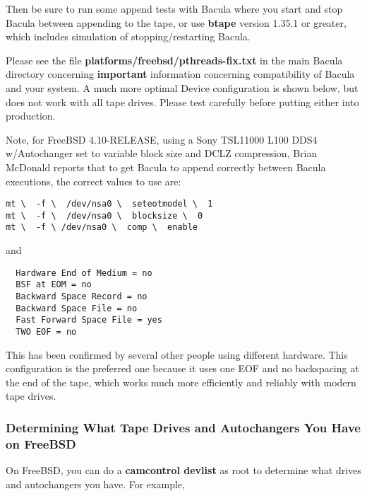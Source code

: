 Then be sure to run some append tests with Bacula where you start and stop
Bacula between appending to the tape, or use {\bf btape} version 1.35.1 or
greater, which includes simulation of stopping/restarting Bacula. 

Please see the file {\bf platforms/freebsd/pthreads-fix.txt} in the main
Bacula directory concerning {\bf important} information concerning
compatibility of Bacula and your system. A much more optimal Device
configuration is shown below, but does not work with all tape drives. Please
test carefully before putting either into production. 

Note, for FreeBSD 4.10-RELEASE, using a Sony TSL11000 L100 DDS4 w/Autochanger
set to variable block size and DCLZ compression, Brian McDonald reports that
to get Bacula to append correctly between Bacula executions, the correct
values to use are: 

\footnotesize
\begin{verbatim}
mt \  -f \  /dev/nsa0 \  seteotmodel \  1
mt \  -f \  /dev/nsa0 \  blocksize \  0
mt \  -f \ /dev/nsa0 \  comp \  enable
\end{verbatim}
\normalsize

and 

\footnotesize
\begin{verbatim}
  Hardware End of Medium = no
  BSF at EOM = no
  Backward Space Record = no
  Backward Space File = no
  Fast Forward Space File = yes
  TWO EOF = no
\end{verbatim}
\normalsize

This has been confirmed by several other people using different hardware. This
configuration is the preferred one because it uses one EOF and no backspacing
at the end of the tape, which works much more efficiently and reliably with
modern tape drives. 

\subsubsection*{Determining What Tape Drives and Autochangers You Have on
FreeBSD}

On FreeBSD, you can do a {\bf camcontrol devlist} as root to determine what
drives and autochangers you have. For example, 

